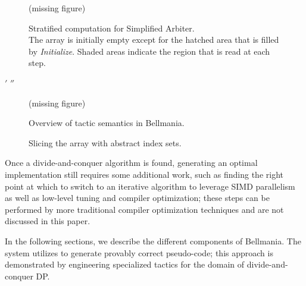 \begin{figure}
\centering
\ifarmando
\bigskip(missing figure)\bigskip
\else

\fi
\caption[caption]{\label{overview:chain}
  Stratified computation for Simplified Arbiter. \\[.2em]
  The array is initially empty except for the hatched area that is
  filled by {\it Initialize}.
  Shaded areas indicate the region that is read at each step. }
\end{figure}


\newcommand\applytactic[1]{{\tt >} \sf #1}
\newcommand\applytacticnode[1]{\node[right,align=left] at (3,1) {\applytactic{#1}}}

\newbox\primebox
\setbox\primebox\hbox{$'$}
\newbox\doubleprimebox
\setbox\doubleprimebox\hbox{$''$}

\newcommand\primeocd[1]{\hspace{\wd\primebox}#1\usebox\primebox}
\newcommand\doubleprimeocd[1]{\hspace{\wd\doubleprimebox}#1\usebox\doubleprimebox}


\begin{figure}
\centering
\ifarmando
\bigskip(missing figure)\bigskip
\else

\fi
\caption[caption]{\label{overview:slice-stratify-synth}
  Overview of tactic semantics in Bellmania. }
\end{figure}


\begin{figure}
\centering
{}
\caption{\label{overview:quadrants-abstract}
  Slicing the array with abstract index sets.}
\end{figure}

Once a divide-and-conquer algorithm is found, generating an optimal implementation still requires some additional work, such as finding the right point at which to switch to an iterative algorithm to leverage SIMD parallelism as well as low-level tuning and compiler optimization;
these steps can be performed by more traditional compiler optimization techniques and are not discussed in this paper.

In the following sections, we describe the different components of Bellmania. 
The system utilizes  to generate provably correct pseudo-code; 
this approach is demonstrated by engineering specialized tactics for the domain of divide-and-conquer DP.
